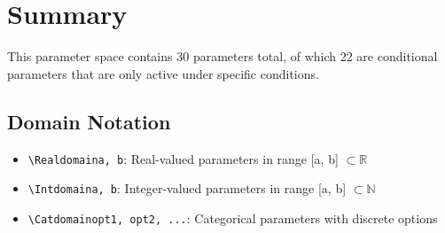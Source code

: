 \documentclass[11pt,a4paper]{article}
\begin{document}
\section{Summary}

This parameter space contains 30 parameters total, of which 22 are conditional parameters that are only active under specific conditions.

\subsection{Domain Notation}

\begin{itemize}
\item \texttt{\textbackslash Realdomain{a, b}}: Real-valued parameters in range [a, b] $\subset \mathbb{R}$
\item \texttt{\textbackslash Intdomain{a, b}}: Integer-valued parameters in range [a, b] $\subset \mathbb{N}$
\item \texttt{\textbackslash Catdomain{opt1, opt2, ...}}: Categorical parameters with discrete options
\end{itemize}
\end{document}
